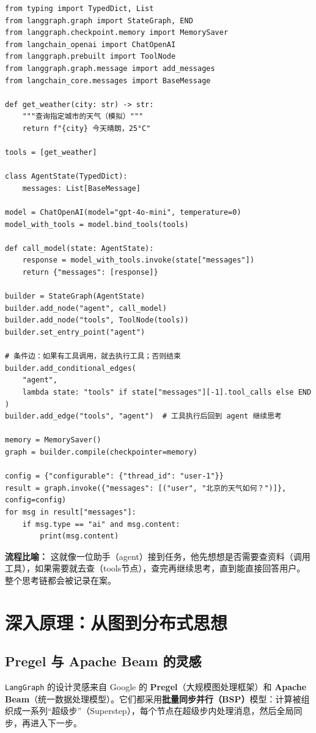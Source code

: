 \documentclass[12pt,a4paper]{ctexart}
\newcommand{\langgraph}{\texttt{LangGraph}}
\begin{document}
\begin{lstlisting}[caption={LLM 智能体 with 工具调用}]
from typing import TypedDict, List
from langgraph.graph import StateGraph, END
from langgraph.checkpoint.memory import MemorySaver
from langchain_openai import ChatOpenAI
from langgraph.prebuilt import ToolNode
from langgraph.graph.message import add_messages
from langchain_core.messages import BaseMessage

def get_weather(city: str) -> str:
    """查询指定城市的天气（模拟）"""
    return f"{city} 今天晴朗，25°C"

tools = [get_weather]

class AgentState(TypedDict):
    messages: List[BaseMessage]

model = ChatOpenAI(model="gpt-4o-mini", temperature=0)
model_with_tools = model.bind_tools(tools)

def call_model(state: AgentState):
    response = model_with_tools.invoke(state["messages"])
    return {"messages": [response]}

builder = StateGraph(AgentState)
builder.add_node("agent", call_model)
builder.add_node("tools", ToolNode(tools))
builder.set_entry_point("agent")

# 条件边：如果有工具调用，就去执行工具；否则结束
builder.add_conditional_edges(
    "agent",
    lambda state: "tools" if state["messages"][-1].tool_calls else END
)
builder.add_edge("tools", "agent")  # 工具执行后回到 agent 继续思考

memory = MemorySaver()
graph = builder.compile(checkpointer=memory)

config = {"configurable": {"thread_id": "user-1"}}
result = graph.invoke({"messages": [("user", "北京的天气如何？")]}, config=config)
for msg in result["messages"]:
    if msg.type == "ai" and msg.content:
        print(msg.content)
\end{lstlisting}

\textbf{流程比喻：} 这就像一位助手（agent）接到任务，他先想想是否需要查资料（调用工具），如果需要就去查（tools节点），查完再继续思考，直到能直接回答用户。整个思考链都会被记录在案。

\section{深入原理：从图到分布式思想}
\label{sec:principle}

\subsection{Pregel 与 Apache Beam 的灵感}
\langgraph{} 的设计灵感来自 Google 的 \textbf{Pregel}（大规模图处理框架）和 \textbf{Apache Beam}（统一数据处理模型）。它们都采用\textbf{批量同步并行（BSP）}模型：计算被组织成一系列“超级步”（Superstep），每个节点在超级步内处理消息，然后全局同步，再进入下一步。
\end{document}
